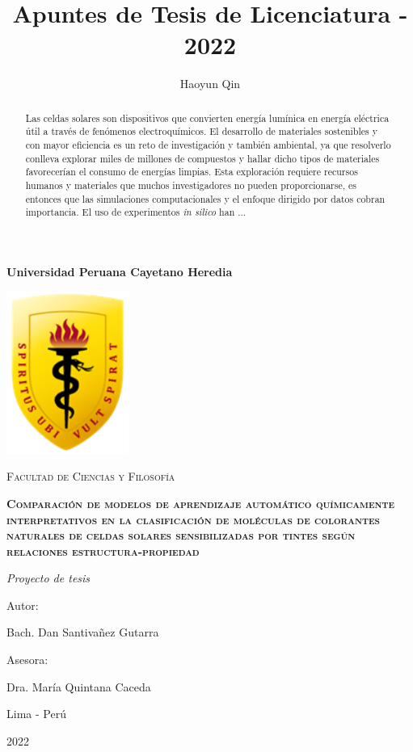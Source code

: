 \documentclass{article}
\title{Apuntes de Tesis de Licenciatura - 2022}
\author{Haoyun Qin}
\theoremstyle{mytheoremstyle}
\theoremstyle{mytheoremstyle}
\theoremstyle{myproblemstyle}
\begin{document}
    \begin{titlepage}
        \centering
        {\bfseries\LARGE Universidad Peruana Cayetano Heredia \par}
        \vspace{1cm}
        {\includegraphics[width=0.3\textwidth]{img/logo_escudo.png}\par}
        \vspace{1cm}
        {\scshape\Large Facultad de Ciencias y Filosofía \par}
        \vspace{1cm}
        {\bfseries\scshape\Large Comparación de modelos de aprendizaje automático químicamente interpretativos en la clasificación de moléculas de colorantes naturales de celdas solares sensibilizadas por tintes según relaciones estructura-propiedad \par}
        \vspace{1cm}
        {\itshape\Large Proyecto de tesis \par}
        \vfill
        {\Large Autor: \par}
        {\Large Bach. Dan Santivañez Gutarra\par}
        \vfill
        {\Large Asesora: \par}
        {\Large Dra. María Quintana Caceda \par}
        \vfill
        {\Large Lima - Perú \par}
        {\Large 2022 \par}
    \end{titlepage}

    \tableofcontents
    \newpage

    \begin{abstract}
        Las celdas solares son dispositivos que convierten energía lumínica en 
        energía eléctrica útil a través de fenómenos electroquímicos. El desarrollo
        de materiales sostenibles y con mayor eficiencia es un reto de investigación
        y también ambiental, ya que resolverlo conlleva explorar miles de millones de 
        compuestos y hallar dicho tipos de materiales favorecerían el consumo de 
        energías limpias. Esta exploración requiere recursos humanos y materiales que
        muchos investigadores no pueden proporcionarse, es entonces que las simulaciones
        computacionales y el enfoque dirigido por datos cobran importancia. El uso de 
        experimentos \textit{in silico} han ... 
    \end{abstract}
\end{document}
